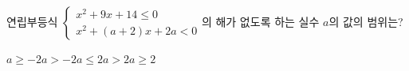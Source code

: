 \hspace*{2mm}\begin{minipage}[t]{\dimexpr\linewidth-2mm\relax}\vspace{0pt}
연립부등식 $\begin{cases} x^2+9x+14\le 0 \\ x^2+(a+2)x+2a<0 \end{cases}$의 해가 없도록 하는 실수 $a$의 값의 범위는?
\begin{choices32}{$a\ge -2$}{$a>-2$}{$a\le 2$}{$a>2$}{$a\ge 2$}\end{choices32}\end{minipage}
